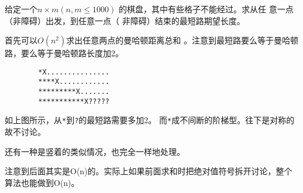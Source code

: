 \begin{prob}
	给定一个$n\times m(n,m \le 1000)$
	的棋盘，其中有些格子不能经过。求从任
	意一点（非障碍）出发，到任意一点（
	非障碍）结束的最短路期望长度。
\end{prob}

\begin{sol}
	首先可以$O(n^2)$求出任意两点的曼哈顿距离总和
	。注意到最短路要么等于曼哈顿路，要么等于曼哈顿路长度加2。\par
	\begin{verbatim}
	    *X...............
	    ****X............
	    *********X.......
	    ***********X?????
	\end{verbatim}
	\par
	如上图所示，从\texttt{*}到\texttt{?}的最短路需要多加2。
	而\texttt{*}成不间断的阶梯型。往下是对称的故不讨论。\par
	还有一种是竖着的类似情况，也完全一样地处理。\par
	注意到后面其实是O(n)的。实际上如果前面求和时把绝对值符号拆开讨论，整个算法也能做到O(n)。
\end{sol}
